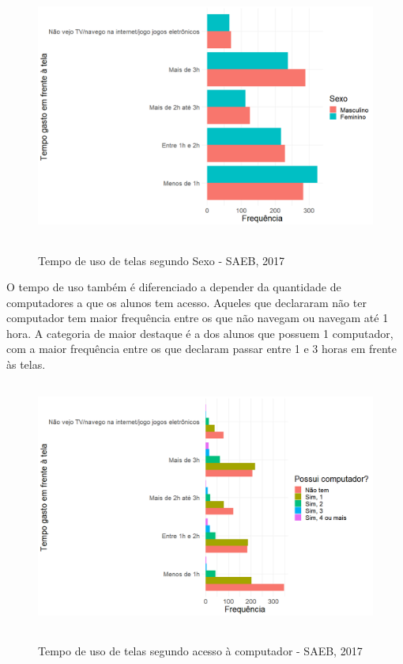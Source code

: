 \documentclass[a4paper, 12pt]{article} %
\begin{document}
\begin{figure}[!ht]
\vspace{-0.25cm}
\caption{Tempo de uso de telas segundo Sexo - SAEB, 2017}
\centering
\includegraphics[height=8.2cm,width=12.7cm]{figuras/plot_usotelas_sexo.png}
\vspace{-0.2cm}
\label{fig4}
\\ 
\end{figure}

O tempo de uso também é diferenciado a depender da quantidade de computadores a que os alunos tem acesso. Aqueles que declararam não ter computador tem maior frequência entre os que não navegam ou navegam até 1 hora. A categoria de maior destaque é a dos alunos que possuem 1 computador, com a maior frequência entre os que declaram passar entre 1 e 3 horas em frente às telas.

\begin{figure}[!ht]
\vspace{-0.25cm}
\caption{Tempo de uso de telas segundo acesso à computador - SAEB, 2017}
\centering
\includegraphics[height=8.2cm,width=12.7cm]{figuras/plot_usotelas_computador.png}
\vspace{-0.2cm}
\label{fig5}
\\ 
\end{figure}
\end{document}

